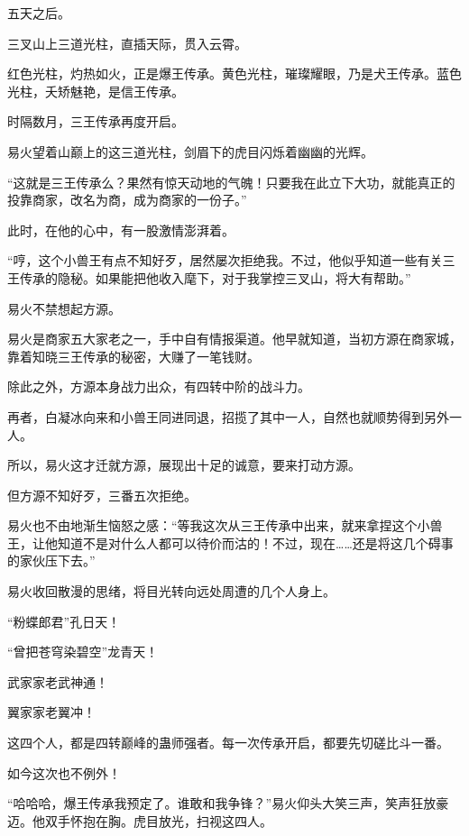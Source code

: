 
\begin{this_body}



五天之后。

三叉山上三道光柱，直插天际，贯入云霄。

红色光柱，灼热如火，正是爆王传承。黄色光柱，璀璨耀眼，乃是犬王传承。蓝色光柱，夭矫魅艳，是信王传承。

时隔数月，三王传承再度开启。

易火望着山巅上的这三道光柱，剑眉下的虎目闪烁着幽幽的光辉。

“这就是三王传承么？果然有惊天动地的气魄！只要我在此立下大功，就能真正的投靠商家，改名为商，成为商家的一份子。”

此时，在他的心中，有一股激情澎湃着。

“哼，这个小兽王有点不知好歹，居然屡次拒绝我。不过，他似乎知道一些有关三王传承的隐秘。如果能把他收入麾下，对于我掌控三叉山，将大有帮助。”

易火不禁想起方源。

易火是商家五大家老之一，手中自有情报渠道。他早就知道，当初方源在商家城，靠着知晓三王传承的秘密，大赚了一笔钱财。

除此之外，方源本身战力出众，有四转中阶的战斗力。

再者，白凝冰向来和小兽王同进同退，招揽了其中一人，自然也就顺势得到另外一人。

所以，易火这才迁就方源，展现出十足的诚意，要来打动方源。

但方源不知好歹，三番五次拒绝。

易火也不由地渐生恼怒之感：“等我这次从三王传承中出来，就来拿捏这个小兽王，让他知道不是对什么人都可以待价而沽的！不过，现在……还是将这几个碍事的家伙压下去。”

易火收回散漫的思绪，将目光转向远处周遭的几个人身上。

“粉蝶郎君”孔日天！

“曾把苍穹染碧空”龙青天！

武家家老武神通！

翼家家老翼冲！

这四个人，都是四转巅峰的蛊师强者。每一次传承开启，都要先切磋比斗一番。

如今这次也不例外！

“哈哈哈，爆王传承我预定了。谁敢和我争锋？”易火仰头大笑三声，笑声狂放豪迈。他双手怀抱在胸。虎目放光，扫视这四人。


\end{this_body}
